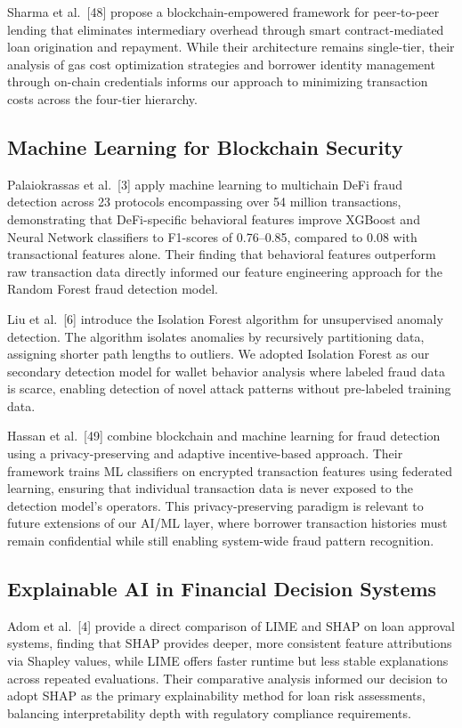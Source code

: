 \documentclass[12pt,a4paper]{report}
\begin{document}
Sharma et al.~[48] propose a blockchain-empowered framework for peer-to-peer lending that eliminates intermediary overhead through smart contract-mediated loan origination and repayment. While their architecture remains single-tier, their analysis of gas cost optimization strategies and borrower identity management through on-chain credentials informs our approach to minimizing transaction costs across the four-tier hierarchy.

\subsection{Machine Learning for Blockchain Security}

Palaiokrassas et al.~[3] apply machine learning to multichain DeFi fraud detection across 23 protocols encompassing over 54 million transactions, demonstrating that DeFi-specific behavioral features improve XGBoost and Neural Network classifiers to F1-scores of 0.76--0.85, compared to 0.08 with transactional features alone. Their finding that behavioral features outperform raw transaction data directly informed our feature engineering approach for the Random Forest fraud detection model.

Liu et al.~[6] introduce the Isolation Forest algorithm for unsupervised anomaly detection. The algorithm isolates anomalies by recursively partitioning data, assigning shorter path lengths to outliers. We adopted Isolation Forest as our secondary detection model for wallet behavior analysis where labeled fraud data is scarce, enabling detection of novel attack patterns without pre-labeled training data.

Hassan et al.~[49] combine blockchain and machine learning for fraud detection using a privacy-preserving and adaptive incentive-based approach. Their framework trains ML classifiers on encrypted transaction features using federated learning, ensuring that individual transaction data is never exposed to the detection model's operators. This privacy-preserving paradigm is relevant to future extensions of our AI/ML layer, where borrower transaction histories must remain confidential while still enabling system-wide fraud pattern recognition.

\subsection{Explainable AI in Financial Decision Systems}

Adom et al.~[4] provide a direct comparison of LIME and SHAP on loan approval systems, finding that SHAP provides deeper, more consistent feature attributions via Shapley values, while LIME offers faster runtime but less stable explanations across repeated evaluations. Their comparative analysis informed our decision to adopt SHAP as the primary explainability method for loan risk assessments, balancing interpretability depth with regulatory compliance requirements.
\end{document}
